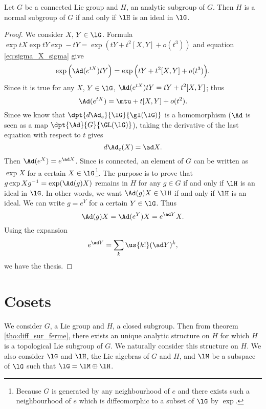 \begin{proposition}
Let $G$ be a connected Lie group and $H$, an analytic subgroup of $G$. Then $H$ is a normal subgroup of $G$ if and only if $\lH$ is an ideal in $\lG$.
\end{proposition}

\begin{proof}
We consider $X$, $Y\in\lG$. Formula $\exp tX\exp tY\exp-tY=\exp( tY+t^2[X,Y]+o(t^3) )$ and equation \eqref{eq:sigma_X_sigma} give
\[
   \exp\Big( \Ad(e^{tX})tY \Big)=\exp\Big(  tY+t^2[X,Y]+o(t^3)  \Big).
\]
Since it is true for any $X$, $Y\in\lG$, $\Ad(e^{tX})tY=tY+t^2[X,Y]$; thus
\begin{equation}
  \Ad(e^{tX})=\mtu+t[X,Y]+o(t^2).
\end{equation}
Since we know that $\dpt{d\Ad_e}{\lG}{\gl(\lG)}$ is a homomorphism ($\Ad$ is seen as a map $\dpt{\Ad}{G}{\GL(\lG)}$), taking the derivative of the last equation with respect to $t$ gives
\begin{equation}
  d\Ad_e(X)=\ad X.
\end{equation}
Then $\Ad(e^X)=e^{\ad X}$. Since is connected, an element of $G$ can be written as $\exp X$ for a certain $X\in\lG$\footnote{Because $G$ is generated by any neighbourhood of $e$ and there exists such a neighbourhood of $e$ which is diffeomorphic to a subset of $\lG$ by $\exp$.}. The purpose is to prove that $g\exp Xg^{-1}=\exp(\Ad(g)X)$ remains in $H$ for any $g\in G$ if and only if $\lH$ is an ideal in $\lG$. In other words, we want $\Ad(g)X\in\lH$ if and only if $\lH$ is an ideal. We can write $g=e^Y$ for a certain $Y\in\lG$. Thus
\[
  \Ad(g)X=\Ad(e^Y)X=e^{\ad Y}X.
\]
Using the expansion 
\begin{equation}
e^{\ad Y}=\sum_k\us{k!}(\ad Y)^k,
\end{equation}
we have the thesis.
\end{proof}

\section{Cosets}

We consider $G$, a Lie group and $H$, a closed subgroup. Then from theorem \ref{tho:diff_sur_ferme},  there exists an unique analytic structure on $H$ for which $H$ is a topological Lie subgroup of $G$. We naturally consider this structure on $H$. We also consider $\lG$ and $\lH$, the Lie algebras of $G$ and $H$, and $\lM$ be a subspace of $\lG$ such that $\lG=\lM\oplus\lH$.

